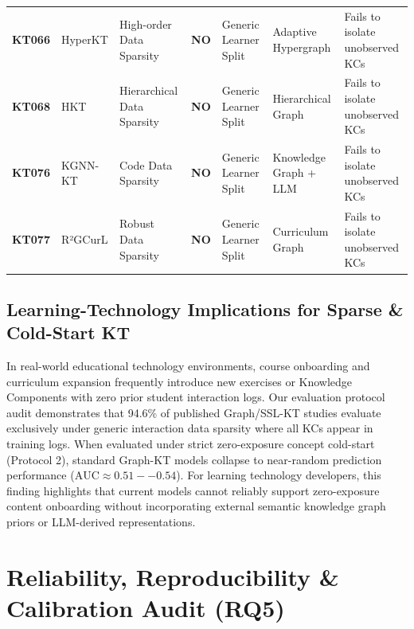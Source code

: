 \documentclass[10pt,journal,compsoc]{IEEEtran}
\begin{document}
\begin{table}[t]
{\begin{tabular}{lllllll}
\textbf{KT066} & HyperKT \cite{KT066_HyperKT_2025} & High-order Data Sparsity & \textbf{NO} & Generic Learner Split & Adaptive Hypergraph & Fails to isolate unobserved KCs \\
\textbf{KT068} & HKT \cite{KT068_HKT_2025} & Hierarchical Data Sparsity & \textbf{NO} & Generic Learner Split & Hierarchical Graph & Fails to isolate unobserved KCs \\
\textbf{KT076} & KGNN-KT \cite{KT076_KGNNKT_2025} & Code Data Sparsity & \textbf{NO} & Generic Learner Split & Knowledge Graph + LLM & Fails to isolate unobserved KCs \\
\textbf{KT077} & R²GCurL \cite{KT077_R2GCurL_2026} & Robust Data Sparsity & \textbf{NO} & Generic Learner Split & Curriculum Graph & Fails to isolate unobserved KCs \\
\bottomrule
\end{tabular}
}
\end{table}

\subsection{Learning-Technology Implications for Sparse \& Cold-Start KT}
In real-world educational technology environments, course onboarding and curriculum expansion frequently introduce new exercises or Knowledge Components with zero prior student interaction logs. Our evaluation protocol audit demonstrates that 94.6\% of published Graph/SSL-KT studies evaluate exclusively under generic interaction data sparsity where all KCs appear in training logs. When evaluated under strict zero-exposure concept cold-start (Protocol 2), standard Graph-KT models collapse to near-random prediction performance ($\text{AUC} \approx 0.51--0.54$). For learning technology developers, this finding highlights that current models cannot reliably support zero-exposure content onboarding without incorporating external semantic knowledge graph priors or LLM-derived representations.

\section{Reliability, Reproducibility \& Calibration Audit (RQ5)}
\end{document}
